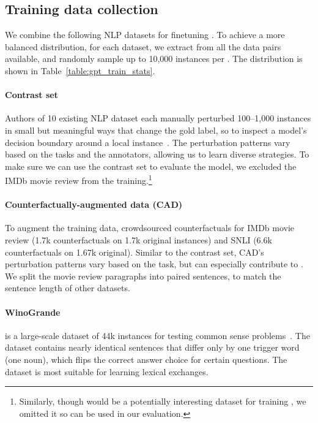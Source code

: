 \subsection{Training data collection}


We combine the following NLP datasets for finetuning \sysname.
To achieve a more balanced distribution, for each dataset, we extract \tagstrs from all the data pairs available, and randomly sample up to 10,000 instances per \tagstr.
The distribution is shown in Table~\ref{table:gpt_train_stats}.

\paragraph{Contrast set}
Authors of 10 existing NLP dataset each manually perturbed 100--1,000 instances in small but meaningful ways that change the gold label, so to inspect a model's decision boundary around a local instance~\cite{gardner2020contrast}.
The perturbation patterns vary based on the tasks and the annotators, allowing us to learn diverse strategies.
To make sure we can use the contrast set to evaluate the \sst model, we excluded the IMDb movie review from the training.\footnote{Similarly, though \qqp would be a potentially interesting dataset for training \sysname, we omitted it so \qqp can be used in our evaluation.}


\paragraph{Counterfactually-augmented data (CAD)}
To augment the training data, \citet{kaushik2019learning} crowdsourced counterfactuals for IMDb movie review (1.7k counterfactuals on 1.7k original instances) and SNLI (6.6k counterfactuals on 1.67k original).
Similar to the contrast set, CAD's perturbation patterns vary based on the task, but can especially contribute to .
We split the movie review paragraphs into paired sentences, to match the sentence length of other datasets.


\paragraph{WinoGrande} is a large-scale dataset of 44k instances for testing common sense problems~\cite{sakaguchi2019winogrande}.
The dataset contains nearly identical sentences that differ only by one trigger word (\eg one noun), which flips the correct answer choice for certain questions.
The dataset is most suitable for learning lexical exchanges.

